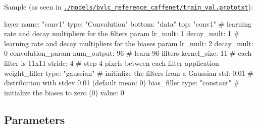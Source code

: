 Sample (as seen in \href{https://github.com/BVLC/caffe/blob/master/models/bvlc_reference_caffenet/train_val.prototxt}{\tt {\ttfamily ./models/bvlc\+\_\+reference\+\_\+caffenet/train\+\_\+val.prototxt}})\+: \begin{DoxyVerb}  layer {
    name: "conv1"
    type: "Convolution"
    bottom: "data"
    top: "conv1"
    # learning rate and decay multipliers for the filters
    param { lr_mult: 1 decay_mult: 1 }
    # learning rate and decay multipliers for the biases
    param { lr_mult: 2 decay_mult: 0 }
    convolution_param {
      num_output: 96     # learn 96 filters
      kernel_size: 11    # each filter is 11x11
      stride: 4          # step 4 pixels between each filter application
      weight_filler {
        type: "gaussian" # initialize the filters from a Gaussian
        std: 0.01        # distribution with stdev 0.01 (default mean: 0)
      }
      bias_filler {
        type: "constant" # initialize the biases to zero (0)
        value: 0
      }
    }
  }
\end{DoxyVerb}


\subsection*{Parameters}


